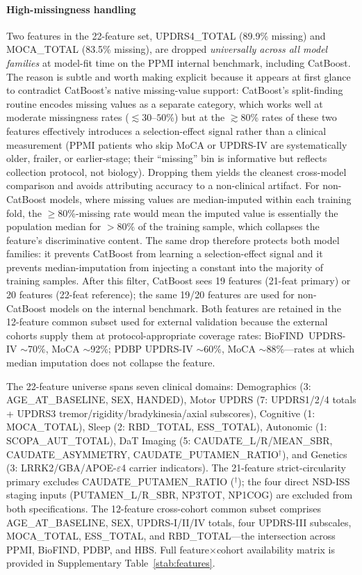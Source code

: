 \paragraph*{High-missingness handling} Two features in the 22-feature set, UPDRS4\_TOTAL (89.9\% missing) and MOCA\_TOTAL (83.5\% missing), are dropped \emph{universally across all model families} at model-fit time on the PPMI internal benchmark, including CatBoost. The reason is subtle and worth making explicit because it appears at first glance to contradict CatBoost's native missing-value support: CatBoost's split-finding routine encodes missing values as a separate category, which works well at moderate missingness rates ($\lesssim 30$--$50$\%) but at the $\gtrsim 80$\% rates of these two features effectively introduces a selection-effect signal rather than a clinical measurement (PPMI patients who skip MoCA or UPDRS-IV are systematically older, frailer, or earlier-stage; their ``missing'' bin is informative but reflects collection protocol, not biology). Dropping them yields the cleanest cross-model comparison and avoids attributing accuracy to a non-clinical artifact. For non-CatBoost models, where missing values are median-imputed within each training fold, the $\geq 80$\%-missing rate would mean the imputed value is essentially the population median for ${>}80$\% of the training sample, which collapses the feature's discriminative content. The same drop therefore protects both model families: it prevents CatBoost from learning a selection-effect signal and it prevents median-imputation from injecting a constant into the majority of training samples. After this filter, CatBoost sees 19 features (21-feat primary) or 20 features (22-feat reference); the same 19/20 features are used for non-CatBoost models on the internal benchmark. Both features are retained in the 12-feature common subset used for external validation because the external cohorts supply them at protocol-appropriate coverage rates: BioFIND~UPDRS-IV $\sim$70\%, MoCA $\sim$92\%; PDBP UPDRS-IV $\sim$60\%, MoCA $\sim$88\%---rates at which median imputation does not collapse the feature.

The 22-feature universe spans seven clinical domains: Demographics (3: AGE\_AT\_BASELINE, SEX, HANDED), Motor UPDRS (7: UPDRS1/2/4 totals + UPDRS3 tremor/rigidity/bradykinesia/axial subscores), Cognitive (1: MOCA\_TOTAL), Sleep (2: RBD\_TOTAL, ESS\_TOTAL), Autonomic (1: SCOPA\_AUT\_TOTAL), DaT Imaging (5: CAUDATE\_L/R/MEAN\_SBR, CAUDATE\_ASYMMETRY, CAUDATE\_PUTAMEN\_RATIO$^{\dagger}$), and Genetics (3: LRRK2/GBA/APOE-$\varepsilon$4 carrier indicators). The 21-feature strict-circularity primary excludes CAUDATE\_PUTAMEN\_RATIO ($^{\dagger}$); the four direct NSD-ISS staging inputs (PUTAMEN\_L/R\_SBR, NP3TOT, NP1COG) are excluded from both specifications. The 12-feature cross-cohort common subset comprises AGE\_AT\_BASELINE, SEX, UPDRS-I/II/IV totals, four UPDRS-III subscales, MOCA\_TOTAL, ESS\_TOTAL, and RBD\_TOTAL---the intersection across PPMI, BioFIND, PDBP, and HBS. Full feature$\times$cohort availability matrix is provided in Supplementary Table~\ref{stab:features}.

